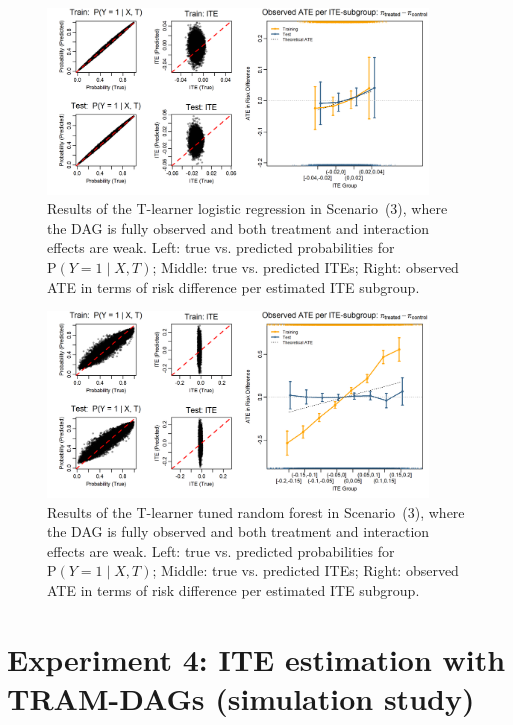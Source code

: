 \begin{figure}[htbp]
\centering
\includegraphics[width=0.9\textwidth]{img/results_ITE_simulation/small_interaction_glm_tlearner.png}
\caption{Results of the T-learner logistic regression in Scenario~(3), where the DAG is fully observed and both treatment and interaction effects are weak. Left: true vs. predicted probabilities for $\text{P}(Y = 1 \mid X, T)$; Middle: true vs. predicted ITEs; Right: observed ATE in terms of risk difference per estimated ITE subgroup.}
\label{fig:small_interaction_glm_tlearner}
\end{figure}




\begin{figure}[htbp]
\centering
\includegraphics[width=0.9\textwidth]{img/results_ITE_simulation/small_interaction_tuned_rf_tlearner.png}
\caption{Results of the T-learner tuned random forest in Scenario~(3), where the DAG is fully observed and both treatment and interaction effects are weak. Left: true vs. predicted probabilities for $\text{P}(Y = 1 \mid X, T)$; Middle: true vs. predicted ITEs; Right: observed ATE in terms of risk difference per estimated ITE subgroup.}
\label{fig:small_interaction_tuned_rf_tlearner}
\end{figure}


\clearpage


\section{Experiment 4: ITE estimation with TRAM-DAGs (simulation study)}

